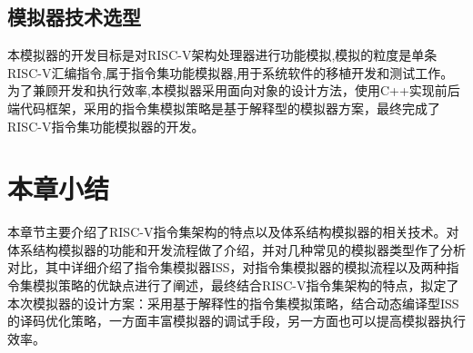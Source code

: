 \subsection{模拟器技术选型}
本模拟器的开发目标是对RISC-V架构处理器进行功能模拟,模拟的粒度是单条RISC-V汇编指令,属于指令集功能模拟器,用于系统软件的移植开发和测试工作。为了兼顾开发和执行效率,本模拟器采用面向对象的设计方法，使用C++实现前后端代码框架，采用的指令集模拟策略是基于解释型的模拟器方案，最终完成了RISC-V指令集功能模拟器的开发。


\section{本章小结}
本章节主要介绍了RISC-V指令集架构的特点以及体系结构模拟器的相关技术。对体系结构模拟器的功能和开发流程做了介绍，并对几种常见的模拟器类型作了分析对比，其中详细介绍了指令集模拟器ISS，对指令集模拟器的模拟流程以及两种指令集模拟策略的优缺点进行了阐述，最终结合RISC-V指令集架构的特点，拟定了本次模拟器的设计方案：采用基于解释性的指令集模拟策略，结合动态编译型ISS的译码优化策略，一方面丰富模拟器的调试手段，另一方面也可以提高模拟器执行效率。